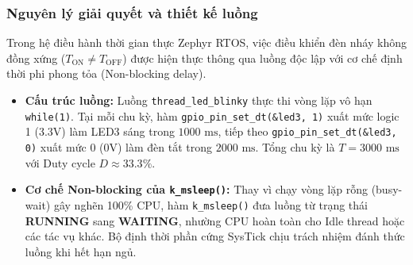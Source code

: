 \subsubsection{Nguyên lý giải quyết và thiết kế luồng}
Trong hệ điều hành thời gian thực Zephyr RTOS, việc điều khiển đèn nháy không đồng xứng ($T_{\text{ON}} \neq T_{\text{OFF}}$) được hiện thực thông qua luồng độc lập với cơ chế định thời phi phong tỏa (Non-blocking delay). 
\begin{itemize}
    \item \textbf{Cấu trúc luồng:} Luồng \texttt{thread\_led\_blinky} thực thi vòng lặp vô hạn \texttt{while(1)}. Tại mỗi chu kỳ, hàm \texttt{gpio\_pin\_set\_dt(\&led3, 1)} xuất mức logic 1 (3.3V) làm LED3 sáng trong $1000\text{ ms}$, tiếp theo \texttt{gpio\_pin\_set\_dt(\&led3, 0)} xuất mức 0 (0V) làm đèn tắt trong $2000\text{ ms}$. Tổng chu kỳ là $T = 3000\text{ ms}$ với Duty cycle $D \approx 33.3\%$.
    \item \textbf{Cơ chế Non-blocking của \texttt{k\_msleep()}:} Thay vì chạy vòng lặp rỗng (busy-wait) gây nghẽn 100\% CPU, hàm \texttt{k\_msleep()} đưa luồng từ trạng thái \textbf{RUNNING} sang \textbf{WAITING}, nhường CPU hoàn toàn cho Idle thread hoặc các tác vụ khác. Bộ định thời phần cứng SysTick chịu trách nhiệm đánh thức luồng khi hết hạn ngủ.
\end{itemize}

